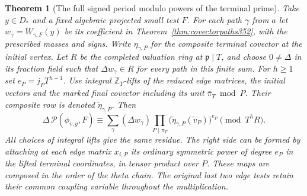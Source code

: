 \documentclass[a4paper,11pt]{article}
\newtheorem{theorem}[proposition]{Theorem}
\theoremstyle{definition}
\theoremstyle{remark}
\numberwithin{equation}{section}
\begin{document}
\begin{theorem}[The full signed period modulo powers of the terminal prime]
\label{thm:initialmoment396}
Take \(y\in D_*\) and a fixed algebraic projected small test
\(F\). For each path \(\gamma\) from \(a\) let
\(w_\gamma=W_{\gamma,F}(y)\) be its coefficient in
Theorem~\ref{thm:covectorpaths352}, with the prescribed
masses and signs. Write \(\eta_{\gamma,P}\) for the composite
terminal covector at the initial vertex. Let \(R\) be the
completed valuation ring at \(\mathfrak p\mid T\), and
choose \(0\ne\Delta\) in its fraction field such that
\(\Delta w_\gamma\in R\) for every path in this finite sum.
For \(h\ge1\) set \(e_P=j_P T^{h-1}\). Use integral
\(\mathbb Z_T\)-lifts of the reduced edge matrices, the
initial vectors and the marked final covector including its
unit \(\bar\pi_T\bmod P\). Their composite row is denoted
\(\widetilde\eta_{\gamma,P}\). Then
\[
 \Delta\,\mathcal P(\phi_{v,y},F)
     \equiv
       \sum_\gamma (\Delta w_\gamma)
           \prod_{P\mid\pi_T}
              \big(\widetilde\eta_{\gamma,P}
                              (\widetilde v_P)\big)^{e_P}
                       \pmod {T^h R}.
\]
All choices of integral lifts give the same residue.
The right side can be formed by attaching at each edge matrix
\(x_{i,P}\) its ordinary symmetric power of degree \(e_P\)
in the lifted terminal coordinates, in tensor product over
\(P\). These maps are composed in the order of the theta chain.
The original last two edge tests retain their common coupling
variable throughout the multiplication.
\end{theorem}
\end{document}
